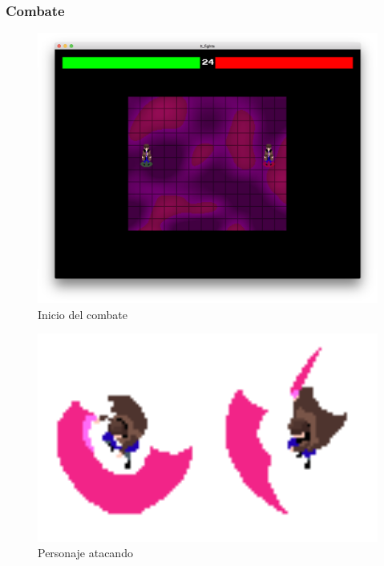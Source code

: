 \subsubsection{Combate}

\begin{figure}[h]
	\centerline{\includegraphics[width=17cm]{otros/manual/pelea1.png}}
	\caption{Inicio del combate}
	\label{uso:pelea1}
\end{figure}


\begin{figure}[h]
	\centerline{\includegraphics[width=14cm]{otros/manual/atacando1.png}}
	\caption{Personaje atacando}
	\label{uso:ataque}
\end{figure}

